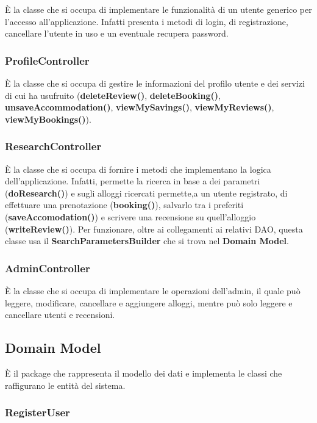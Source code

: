 \documentclass[10pt]{article}
\begin{document}
\`E la classe che si occupa di implementare le funzionalità di un utente generico per l'accesso all'applicazione. Infatti presenta i metodi di login, di registrazione, cancellare l'utente in uso e un eventuale recupera password.

\subsubsection{ProfileController}

\`E la classe che si occupa di gestire le informazioni del profilo utente e dei servizi di cui ha usufruito (\textbf{deleteReview()}, \textbf{deleteBooking()}, \textbf{unsaveAccommodation()}, \textbf{viewMySavings()}, \textbf{viewMyReviews()}, \textbf{viewMyBookings()}).

\subsubsection{ResearchController}

\`E la classe che si occupa di fornire i metodi che implementano la logica dell'applicazione. Infatti, permette la ricerca in base a dei parametri (\textbf{doResearch()}) e sugli alloggi ricercati permette,a un utente registrato, di effettuare una prenotazione (\textbf{booking()}), salvarlo tra i preferiti (\textbf{saveAccomodation()}) e scrivere una recensione su quell'alloggio (\textbf{writeReview()}). Per funzionare, oltre ai collegamenti ai relativi DAO, questa classe usa il \textbf{SearchParametersBuilder} che si trova nel \textbf{Domain Model}.

\subsubsection{AdminController}

\`E la classe che si occupa di implementare le operazioni dell'admin, il quale può  leggere, modificare, cancellare e aggiungere alloggi, mentre può solo leggere e cancellare utenti e recensioni.
 
\subsection{Domain Model}

\`E il package che rappresenta il modello dei dati e implementa le classi che raffigurano le entità del sistema.

\subsubsection{RegisterUser}
\end{document}
